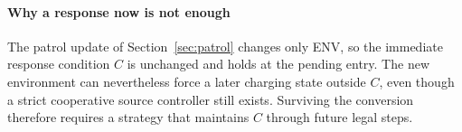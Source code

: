\paragraph{Why a response now is not enough}
The patrol update of Section~\ref{sec:patrol} changes only ENV, so the
immediate response condition $C$ is unchanged and holds at the pending
entry. The new environment can nevertheless force a later charging
state outside $C$, even though a strict cooperative source controller
still exists. Surviving the conversion therefore requires a strategy
that maintains $C$ through future legal steps.
